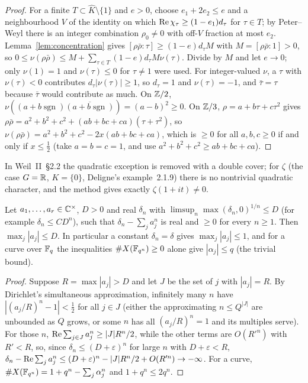\begin{proof}
For a finite $T\subset\widehat K\setminus\{1\}$ and $e>0$, choose $e_1+2e_2\le e$ and a neighbourhood $V$ of the identity on which $\operatorname{Re}\chi_\tau\ge(1-e_1)d_\tau$ for $\tau\in T$; by Peter--Weyl there is an integer combination $\rho_0\ne0$ with off-$V$ fraction at most $e_2$. Lemma~\ref{lem:concentration} gives $[\rho\bar\rho:\tau]\ge(1-e)d_\tau M$ with $M=[\rho\bar\rho:1]>0$, so $0\le\nu(\rho\bar\rho)\le M+\sum_{\tau\in T}(1-e)d_\tau M\nu(\tau)$. Divide by $M$ and let $e\to0$; only $\nu(1)=1$ and $\nu(\tau)\le0$ for $\tau\ne1$ were used. For integer-valued $\nu$, a $\tau$ with $\nu(\tau)<0$ contributes $d_\tau|\nu(\tau)|\ge1$, so $d_\tau=1$ and $\nu(\tau)=-1$, and $\bar\tau=\tau$ because $\bar\tau$ would contribute as much. On $\mathbb{Z}/2$, $\nu((a+b\operatorname{sgn})\overline{(a+b\operatorname{sgn})})=(a-b)^2\ge0$. On $\mathbb{Z}/3$, $\rho=a+b\tau+c\tau^2$ gives $\rho\bar\rho=a^2+b^2+c^2+(ab+bc+ca)(\tau+\tau^2)$, so $\nu(\rho\bar\rho)=a^2+b^2+c^2-2x(ab+bc+ca)$, which is $\ge0$ for all $a,b,c\ge0$ if and only if $x\le\tfrac12$ (take $a=b=c=1$, and use $a^2+b^2+c^2\ge ab+bc+ca$).
\end{proof}

In Weil~II~§2.2 the quadratic exception is removed with a double cover; for $\zeta$ (the case $G=\mathbb{R}$, $K=\{0\}$, Deligne's example~2.1.9) there is no nontrivial quadratic character, and the method gives exactly $\zeta(1+it)\ne0$.

\begin{lemma}\label{lem:powersums}
Let $a_1,\dots,a_r\in\mathbb{C}^\times$, $D>0$ and real $\delta_n$ with $\limsup_n\max(\delta_n,0)^{1/n}\le D$ (for example $\delta_n\le CD^n$), such that $\delta_n-\sum_ja_j^n$ is real and $\ge0$ for every $n\ge1$. Then $\max_j|a_j|\le D$. In particular a constant $\delta_n=\delta$ gives $\max_j|a_j|\le1$, and for a curve over $\mathbb{F}_q$ the inequalities $\#X(\mathbb{F}_{q^n})\ge0$ alone give $|\alpha_j|\le q$ (the trivial bound).
\end{lemma}

\begin{proof}
Suppose $R=\max|a_j|>D$ and let $J$ be the set of $j$ with $|a_j|=R$. By Dirichlet's simultaneous approximation, infinitely many $n$ have $|(a_j/R)^n-1|<\tfrac12$ for all $j\in J$ (either the approximating $n\le Q^{|J|}$ are unbounded as $Q$ grows, or some $n$ has all $(a_j/R)^n=1$ and its multiples serve). For those $n$, $\operatorname{Re}\sum_{j\in J}a_j^n\ge|J|R^n/2$, while the other terms are $O(R'^n)$ with $R'<R$, so, since $\delta_n\le(D+\varepsilon)^n$ for large $n$ with $D+\varepsilon<R$, $\delta_n-\operatorname{Re}\sum_ja_j^n\le(D+\varepsilon)^n-|J|R^n/2+O(R'^n)\to-\infty$. For a curve, $\#X(\mathbb{F}_{q^n})=1+q^n-\sum_j\alpha_j^n$ and $1+q^n\le2q^n$.
\end{proof}

